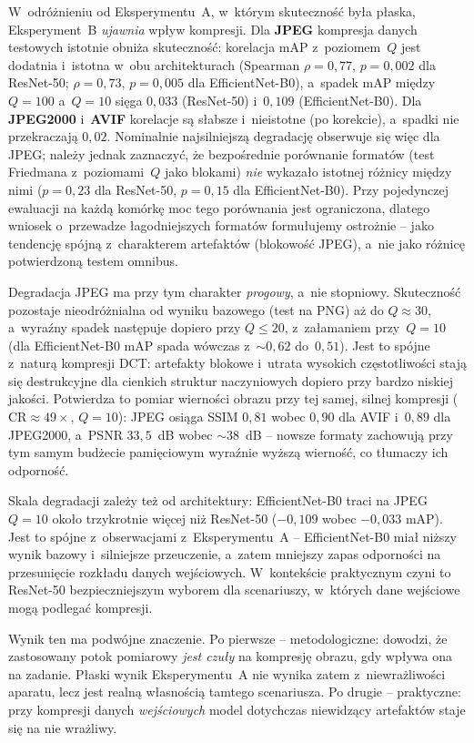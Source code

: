 \documentclass[12pt,a4paper]{article}
\begin{document}
W~odróżnieniu od Eksperymentu~A, w~którym skuteczność była płaska, Eksperyment~B \emph{ujawnia} wpływ kompresji. Dla \textbf{JPEG} kompresja danych testowych istotnie obniża skuteczność: korelacja mAP z~poziomem~$Q$ jest dodatnia i~istotna w~obu architekturach (Spearman $\rho=0{,}77$, $p=0{,}002$ dla ResNet-50; $\rho=0{,}73$, $p=0{,}005$ dla EfficientNet-B0), a~spadek mAP między $Q=100$ a~$Q=10$ sięga $0{,}033$ (ResNet-50) i~$0{,}109$ (EfficientNet-B0). Dla \textbf{JPEG2000} i~\textbf{AVIF} korelacje są słabsze i~nieistotne (po korekcie), a~spadki nie przekraczają $0{,}02$. Nominalnie najsilniejszą degradację obserwuje się więc dla JPEG; należy jednak zaznaczyć, że bezpośrednie porównanie formatów (test Friedmana z~poziomami~$Q$ jako blokami) \emph{nie} wykazało istotnej różnicy między nimi ($p=0{,}23$ dla ResNet-50, $p=0{,}15$ dla EfficientNet-B0). Przy pojedynczej ewaluacji na każdą komórkę moc tego porównania jest ograniczona, dlatego wniosek o~przewadze łagodniejszych formatów formułujemy ostrożnie -- jako tendencję spójną z~charakterem artefaktów (blokowość JPEG), a~nie jako różnicę potwierdzoną testem omnibus.

Degradacja JPEG ma przy tym charakter \emph{progowy}, a~nie stopniowy. Skuteczność pozostaje nieodróżnialna od wyniku bazowego (test na PNG) aż do $Q \approx 30$, a~wyraźny spadek następuje dopiero przy $Q \le 20$, z~załamaniem przy~$Q=10$ (dla EfficientNet-B0 mAP spada wówczas z~${\sim}0{,}62$ do~$0{,}51$). Jest to spójne z~naturą kompresji DCT: artefakty blokowe i~utrata wysokich częstotliwości stają się destrukcyjne dla cienkich struktur naczyniowych dopiero przy bardzo niskiej jakości. Potwierdza to pomiar wierności obrazu przy tej samej, silnej kompresji ($\mathrm{CR}\approx 49\times$, $Q=10$): JPEG osiąga SSIM $0{,}81$ wobec $0{,}90$ dla AVIF i~$0{,}89$ dla JPEG2000, a~PSNR $33{,}5$~dB wobec ${\sim}38$~dB -- nowsze formaty zachowują przy tym samym budżecie pamięciowym wyraźnie wyższą wierność, co tłumaczy ich odporność.

Skala degradacji zależy też od architektury: EfficientNet-B0 traci na JPEG~$Q=10$ około trzykrotnie więcej niż ResNet-50 ($-0{,}109$ wobec $-0{,}033$ mAP). Jest to spójne z~obserwacjami z~Eksperymentu~A -- EfficientNet-B0 miał niższy wynik bazowy i~silniejsze przeuczenie, a~zatem mniejszy zapas odporności na przesunięcie rozkładu danych wejściowych. W~kontekście praktycznym czyni to ResNet-50 bezpieczniejszym wyborem dla scenariuszy, w~których dane wejściowe mogą podlegać kompresji.

Wynik ten ma podwójne znaczenie. Po pierwsze -- metodologiczne: dowodzi, że zastosowany potok pomiarowy \emph{jest czuły} na kompresję obrazu, gdy wpływa ona na zadanie. Płaski wynik Eksperymentu~A nie wynika zatem z~niewrażliwości aparatu, lecz jest realną własnością tamtego scenariusza. Po drugie -- praktyczne: przy kompresji danych \emph{wejściowych} model dotychczas niewidzący artefaktów staje się na nie wrażliwy.
\end{document}
